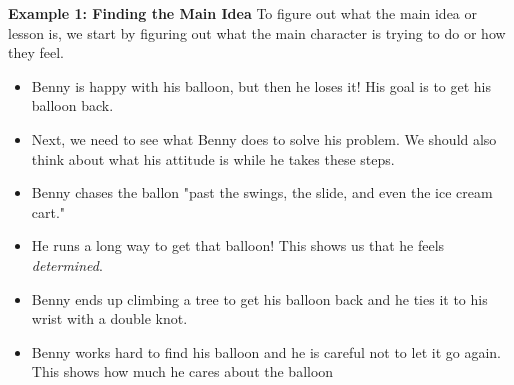 \documentclass[12pt]{article}
\begin{document}
\vspace{1em}
\begin{tcolorbox}[colframe=black!60, colback=white, 
coltitle=black, colbacktitle=black!15, fonttitle=\bfseries\Large, 
title=Examples, halign title=center, left=10pt, right=10pt, top=10pt, bottom=15pt]

\textbf{Example 1: Finding the Main Idea}
To figure out what the main idea or lesson is, we start by figuring out what the main character is trying to do or how they feel.
    \begin{itemize}
        \item Benny is happy with his balloon, but then he loses it! His goal is to get his balloon back.
    \end{itemize}

\begin{itemize}
    \item Next, we need to see what Benny does to solve his problem. We should also think about what his attitude is while he takes these steps.
\end{itemize}
        \begin{itemize}
       
                \item 
                Benny chases the ballon "past the swings, the slide, and even the ice cream cart."
           
        \end{itemize}
            \begin{itemize}
                
                
                        \item He runs a long way to get that balloon! This shows us that he feels \textit{determined}.
                   
             
            \end{itemize}
        \begin{itemize}
         
                \item Benny ends up climbing a tree to get his balloon back and he ties it to his wrist with a double knot.
            
        \end{itemize}
            \begin{itemize}
             
                
                        \item Benny works hard to find his balloon and he is careful not to let it go again. This shows how much he cares about the balloon
                    

\end{itemize}
\end{tcolorbox}
\end{document}
